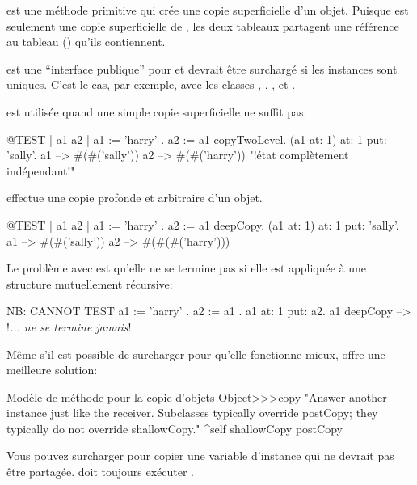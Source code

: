 \documentclass[a4paper,10pt,twoside]{book}
\begin{document}
 est une méthode primitive qui crée une copie superficielle d'un objet. Puisque  est seulement une copie superficielle de , les deux tableaux partagent une référence au tableau () qu'ils contiennent.

 est une ``interface publique'' pour  et devrait être surchargé si les instances sont uniques. C'est le cas, par exemple, avec les classes , , ,  et .

 est utilisée quand une simple copie superficielle ne suffit pas:

\begin{code}{@TEST | a1 a2 |}
a1 := { { 'harry' } } .
a2 := a1 copyTwoLevel.
(a1 at: 1) at: 1 put: 'sally'.
a1 --> #(#('sally'))
a2 --> #(#('harry'))    "!état complètement indépendant!"
\end{code}

 effectue une copie profonde et arbitraire d'un objet.

\begin{code}{@TEST | a1 a2 |}
a1 := { { { 'harry' } } } .
a2 := a1 deepCopy.
(a1 at: 1) at: 1 put: 'sally'.
a1 --> #(#('sally'))
a2 --> #(#(#('harry')))
\end{code}

Le problème avec  est qu'elle ne se termine pas si elle est appliquée à une structure mutuellement récursive:

\begin{code}{NB: CANNOT TEST}
a1 := { 'harry' }.
a2 := { a1 }.
a1 at: 1 put: a2.
a1 deepCopy --> !\emph{... ne se termine jamais}!
\end{code}

Même s'il est possible de surcharger  pour qu'elle fonctionne mieux,  offre une meilleure solution:

\begin{method}{Modèle de méthode pour la copie d'objets}
Object>>>copy
    "Answer another instance just like the receiver. Subclasses typically override postCopy;
    they typically do not override shallowCopy."
    ^self shallowCopy postCopy
\end{method}

Vous pouvez surcharger  pour copier une variable d'instance qui ne devrait pas être partagée.  doit toujours exécuter .
\end{document}
